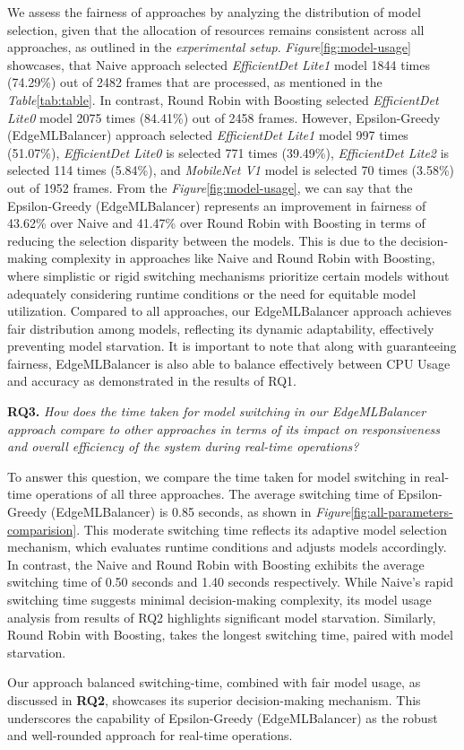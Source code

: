 \smallskip
\noindent
We assess the fairness of approaches by analyzing the distribution of model selection, given that the allocation of resources remains consistent across all approaches, as outlined in the \textit{experimental setup}. \textit{Figure}\ref{fig:model-usage} showcases, that Naive approach selected \textit{EfficientDet Lite1} model 1844 times (74.29\%) out of 2482 frames that are processed, as mentioned in the \textit{Table}\ref{tab:table}. In contrast, Round Robin with Boosting selected \textit{EfficientDet Lite0} model 2075 times (84.41\%) out of 2458 frames. However, Epsilon-Greedy (EdgeMLBalancer) approach selected \textit{EfficientDet Lite1} model 997 times (51.07\%), \textit{EfficientDet Lite0} is selected 771 times (39.49\%), \textit{EfficientDet Lite2} is selected 114 times (5.84\%), and \textit{MobileNet V1} model is selected 70 times (3.58\%) out of 1952 frames. From the \textit{Figure}\ref{fig:model-usage}, we can say that the Epsilon-Greedy (EdgeMLBalancer) represents an improvement in fairness of 43.62\% over Naive and 41.47\% over Round Robin with Boosting in terms of reducing the selection disparity between the models. This is due to the decision-making complexity in approaches like Naive and Round Robin with Boosting, where simplistic or rigid switching mechanisms prioritize certain models without adequately considering runtime conditions or the need for equitable model utilization. Compared to all approaches, our EdgeMLBalancer approach achieves fair distribution among models, reflecting its dynamic adaptability, effectively preventing model starvation. It is important to note that along with guaranteeing fairness, EdgeMLBalancer is also able to balance effectively between CPU Usage and accuracy as demonstrated in the results of RQ1.

\smallskip
\noindent
\textbf{RQ3.} \textit{How does the time taken for model switching in our EdgeMLBalancer approach compare to other approaches in terms of its impact on responsiveness and overall efficiency of the system during real-time operations?}

\smallskip
\noindent
To answer this question, we compare the time taken for model switching in real-time operations of all three approaches. The average switching time of Epsilon-Greedy (EdgeMLBalancer) is 0.85 seconds, as shown in \textit{Figure}\ref{fig:all-parameters-comparision}. This moderate switching time reflects its adaptive model selection mechanism, which evaluates runtime conditions and adjusts models accordingly. In contrast, the Naive and Round Robin with Boosting exhibits the average switching time of 0.50 seconds and 1.40 seconds respectively. While Naive's rapid switching time suggests minimal decision-making complexity, its model usage analysis from results of RQ2 highlights significant model starvation. Similarly, Round Robin with Boosting, takes the longest switching time, paired with model starvation. 

Our approach balanced switching-time, combined with fair model usage, as discussed in \textbf{RQ2}, showcases its superior decision-making mechanism. This underscores the capability of Epsilon-Greedy (EdgeMLBalancer) as the robust and well-rounded approach for real-time operations. 






 



